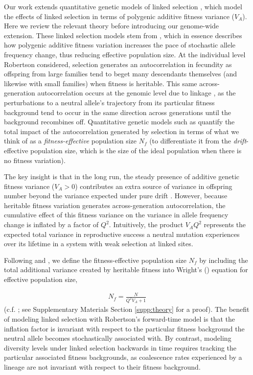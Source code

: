 \documentclass[11pt]{article}
\begin{document}
Our work extends quantitative genetic models of linked selection
\parencite{Robertson1961-ho,Santiago1995-hx,Santiago1998-bs,Santiago2016-mu},
which model the effects of linked selection in terms of polygenic additive fitness
variance ($V_A$). Here we review the relevant theory before introducing our genome-wide extension. These linked selection models stem from
\textcite{Robertson1961-ho}, which in essence describes how polygenic additive
fitness variation increases the pace of stochastic allele frequency change, thus reducing effective population size. At the individual level Robertson considered, 
selection generates an autocorrelation in fecundity as offspring from large
families tend to beget many descendants themselves (and likewise with small
families) when fitness is heritable. This same across-generation autocorrelation occurs at the
genomic level due to linkage \parencite{Santiago1998-bs,Barton2000-zg}, as the
perturbations to a neutral allele's trajectory from its particular fitness
background tend to occur in the same direction across generations until the
background recombines off. Quantitative genetic models such as \textcite{Santiago1998-bs}
quantify the total impact of the autocorrelation generated by selection in terms of what we think of as a
\emph{fitness-effective} population size $N_f$ (to differentiate it from the \emph{drift}-effective population size, which is the size of the ideal population when there is no fitness variation).

The key insight is that in the long run, the steady presence of additive genetic fitness variance ($V_A > 0$) contributes an extra source of variance in offspring number beyond the variance expected under pure drift \parencite{Wright1938-tv}. However, because heritable fitness variation generates across-generation autocorrelation, the cumulative effect of this fitness variance on the variance in allele frequency change is inflated by a factor of $Q^2$. Intuitively, the product $V_A Q^2$ represents the expected
total variance in reproductive success a neutral mutation experiences over its lifetime in a system with weak selection at linked sites. 

Following \textcite{Robertson1961-ho} and \textcite{Santiago1995-hx}, we define
the fitness-effective population size $N_f$ by including the total additional
variance created by heritable fitness into Wright's (\citeyear{Wright1938-tv})
equation for effective population size,

\begin{align}
    \label{eq:main_Ne}
    N_f = \frac{N}{Q^2 V_A + 1}
\end{align}
%
(c.f. \cite{Robertson1961-ho,Santiago1995-hx}; see Supplementary Materials Section
\ref{supp:theory} for a proof). The benefit of modeling linked selection with Robertson's
forward-time model is that the inflation factor is invariant with respect to the particular fitness background the neutral allele becomes stochastically associated with. By contrast,  modeling diversity levels under linked selection backwards in time requires tracking the particular associated fitness backgrounds, as coalescence rates experienced by a lineage are not invariant with respect to their fitness background.
\end{document}
